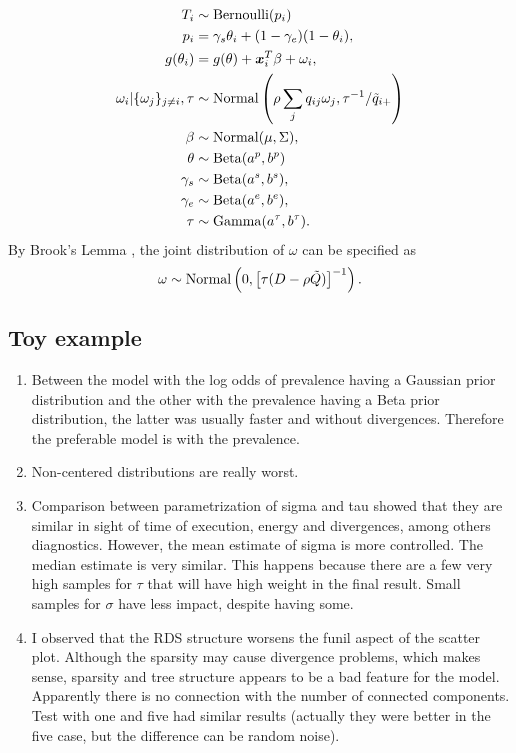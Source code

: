 \begin{equation}
  \begin{aligned}
    T_i &\sim \operatorname{Bernoulli}(p_i) \\
    p_i &= \gamma_s\theta_i + (1-\gamma_e)(1 - \theta_i),  \\
    g(\theta_i) &= g(\theta) + \boldsymbol{x}_i^T\beta + \omega_i,  \\
    \omega_i|\{\omega_j\}_{j\neq i}, \tau &\sim \operatorname{Normal}\left(\rho\sum_j q_{ij}\omega_j, \tau^{-1}/\tilde{q}_{i+}\right) \\
    \beta &\sim \operatorname{Normal}(\mu, \Sigma), \\ 
    \theta &\sim \operatorname{Beta}(a^p, b^p) \\
    \gamma_s &\sim \operatorname{Beta}(a^s, b^s), \\
    \gamma_e &\sim \operatorname{Beta}(a^e, b^e), \\  
    \tau &\sim \operatorname{Gamma}(a^{\tau}, b^{\tau}).
  \end{aligned}  
\end{equation}
By Brook's Lemma \cite[]{brook1964distinction}, the joint distribution of
$\omega$ can be specified as 
$$
\omega \sim \operatorname{Normal}\left(0, \left[\tau (D - \rho \tilde{Q})\right]^{-1}\right).
$$

\subsection{Toy example}

\begin{enumerate}
  \item Between the model with the log odds of prevalence having a Gaussian prior
  distribution and the other with the prevalence having a Beta prior
  distribution, 
  the latter was usually faster and without divergences. Therefore the 
  preferable model is with the prevalence. 

  \item Non-centered distributions are really worst. 
  \item Comparison between parametrization of sigma and tau showed that
  they are similar in sight of time of execution, energy and divergences,
  among others diagnostics. However, the mean estimate of sigma is more
  controlled. The median estimate is very similar. This happens because there
  are a few very high samples for $\tau$ that will have high weight in the
  final result. Small samples for $\sigma$ have less impact, despite having
  some. 
  \item I observed that the RDS structure worsens the funil aspect of the
  scatter plot. Although the sparsity may cause divergence problems, which
  makes sense, sparsity and tree structure appears to be a bad feature for the
  model. Apparently there is no connection with the number of connected
  components. Test with one and five had similar results (actually they were
  better in the five case, but the difference can be random noise).
\end{enumerate}

